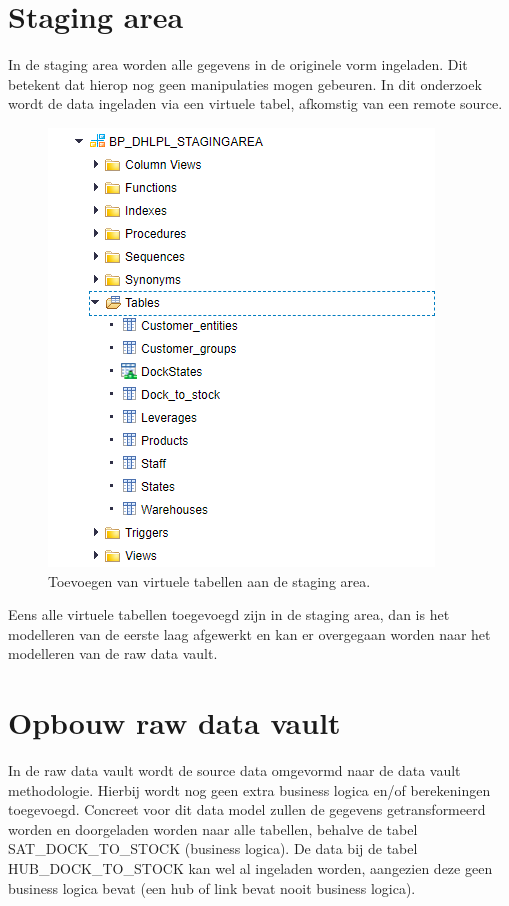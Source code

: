 \section{Staging area}
\label{sec:stagareadv}
In de staging area worden alle gegevens in de originele vorm ingeladen. Dit betekent dat hierop nog geen manipulaties mogen gebeuren. In dit onderzoek wordt de data ingeladen via een virtuele tabel, afkomstig van een remote source.

\begin{figure}[h]
	\centering
	\includegraphics[scale=0.45]{../images/DV_staging.png}
	\caption{Toevoegen van virtuele tabellen aan de staging area.}
	\label{fig:dpa}
\end{figure}

Eens alle virtuele tabellen toegevoegd zijn in de staging area, dan is het modelleren van de eerste laag afgewerkt en kan er overgegaan worden naar het modelleren van de raw data vault.

\section{Opbouw raw data vault}
In de raw data vault wordt de source data omgevormd naar de data vault methodologie. Hierbij wordt nog geen extra business logica en/of berekeningen toegevoegd. Concreet voor dit data model zullen de gegevens getransformeerd worden en doorgeladen worden naar alle tabellen, behalve de tabel SAT\_DOCK\_TO\_STOCK (business logica). De data bij de tabel HUB\_DOCK\_TO\_STOCK kan wel al ingeladen worden, aangezien deze geen business logica bevat (een hub of link bevat nooit business logica).

